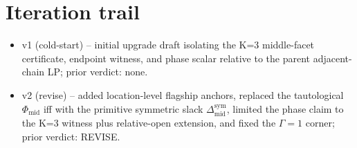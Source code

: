 \documentclass[11pt]{article}
\theoremstyle{definition}
\theoremstyle{plain}
\theoremstyle{remark}
\begin{document}
\section{Iteration trail}
\begin{itemize}[leftmargin=*]
\item v1 (cold-start) -- initial upgrade draft isolating the K=3 middle-facet certificate, endpoint witness, and phase scalar relative to the parent adjacent-chain LP; prior verdict: none.
\item v2 (revise) -- added location-level flagship anchors, replaced the tautological \(\Phi_{\mathrm{mid}}\) iff with the primitive symmetric slack \(\Delta_{\mathrm{mid}}^{\mathrm{sym}}\), limited the phase claim to the K=3 witness plus relative-open extension, and fixed the \(\Gamma=1\) corner; prior verdict: REVISE.
\end{itemize}
\end{document}
